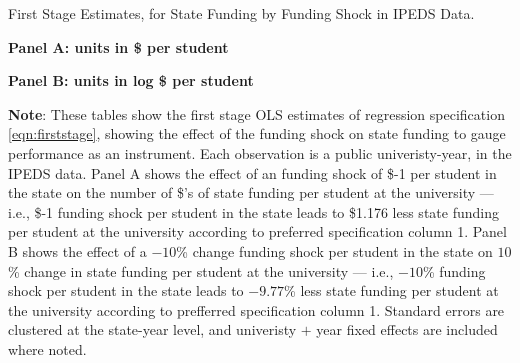 \newpage
\begin{table}[H]
    \singlespacing
    \centering
    \caption{First Stage Estimates, for State Funding by Funding Shock in IPEDS Data.}
    \textbf{Panel A: units in \$ per student}
    
    \makebox[\textwidth][c]{}
    
    \textbf{Panel B: units in log \$ per student}
    
    \makebox[\textwidth][c]{}

    \label{tab:firststage-reg}
    \justify
    \footnotesize
    \textbf{Note}:
    These tables show the first stage OLS estimates of regression specification \eqref{eqn:firststage}, showing the effect of the funding shock on state funding to gauge performance as an instrument.
    Each observation is a public univeristy-year, in the IPEDS data.
    Panel A shows the effect of an funding shock of \$-1 per student in the state on the number of \$'s of state funding per student at the university --- i.e.,
    \$-1 funding shock per student in the state leads to \$1.176 less state funding per student at the university according to preferred specification column 1.
    Panel B shows the effect of a $-10$\% change funding shock per student in the state on $10$\% change in state funding per student at the university --- i.e.,
    $-10$\% funding shock per student in the state leads to $-9.77$\% less state funding per student at the university according to prefferred specification column 1.        
    Standard errors are clustered at the state-year level, and univeristy $+$ year fixed effects are included where noted.
\end{table}

